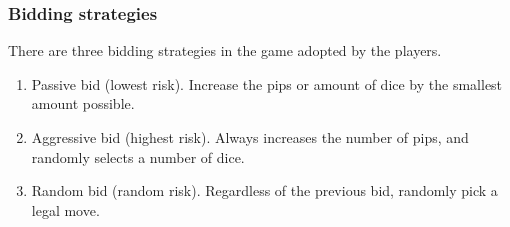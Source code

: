 \documentclass{article}
\begin{document}
\subsubsection*{Bidding strategies}
There are three bidding strategies in the game adopted by the players. 
\begin{enumerate}
    \item Passive bid (lowest risk). Increase the pips or amount of dice by the smallest amount possible.
    \item Aggressive bid (highest risk). Always increases the number of pips, and randomly selects a number of dice.
    \item Random bid (random risk). Regardless of the previous bid, randomly pick a legal move.
\end{enumerate}
\end{document}
